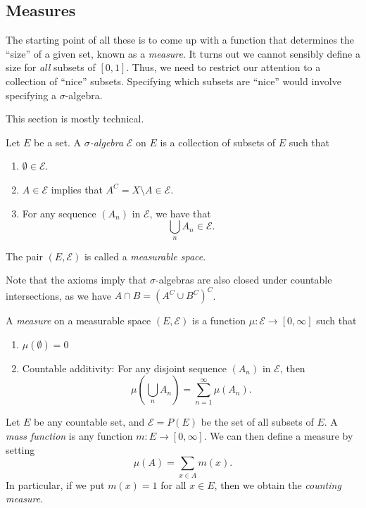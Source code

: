 \documentclass[a4paper]{article}
\begin{document}
\subsection{Measures}
The starting point of all these is to come up with a function that determines the ``size'' of a given set, known as a \emph{measure}. It turns out we cannot sensibly define a size for \emph{all} subsets of $[0, 1]$. Thus, we need to restrict our attention to a collection of ``nice'' subsets. Specifying which subsets are ``nice'' would involve specifying a $\sigma$-algebra.

This section is mostly technical.

\begin{defi}
  Let $E$ be a set. A \emph{$\sigma$-algebra} $\mathcal{E}$ on $E$ is a collection of subsets of $E$ such that
  \begin{enumerate}
    \item $\emptyset \in \mathcal{E}$.
    \item $A \in \mathcal{E}$ implies that $A^C = X \setminus A \in \mathcal{E}$.
    \item For any sequence $(A_n)$ in $\mathcal{E}$, we have that
      \[
        \bigcup_n A_n \in \mathcal{E}.
      \]
  \end{enumerate}
  The pair $(E, \mathcal{E})$ is called a \emph{measurable space}.
\end{defi}
Note that the axioms imply that $\sigma$-algebras are also closed under countable intersections, as we have $A \cap B = (A^C \cup B^C)^C$.

\begin{defi}[Measure]
  A \emph{measure} on a measurable space $(E, \mathcal{E})$ is a function $\mu: \mathcal{E} \to [0, \infty]$ such that
  \begin{enumerate}
    \item $\mu(\emptyset) = 0$
    \item Countable additivity: For any disjoint sequence $(A_n)$ in $\mathcal{E}$, then
      \[
        \mu\left(\bigcup_n A_n\right) = \sum_{n = 1}^\infty \mu(A_n).
      \]
  \end{enumerate}
\end{defi}

\begin{eg}
  Let $E$ be any countable set, and $\mathcal{E} = P(E)$ be the set of all subsets of $E$. A \emph{mass function} is any function $m: E \to [0, \infty]$. We can then define a measure by setting
  \[
    \mu(A) = \sum_{x \in A} m(x).
  \]
  In particular, if we put $m(x) = 1$ for all $x \in E$, then we obtain the \emph{counting measure}.
\end{eg}
\end{document}
